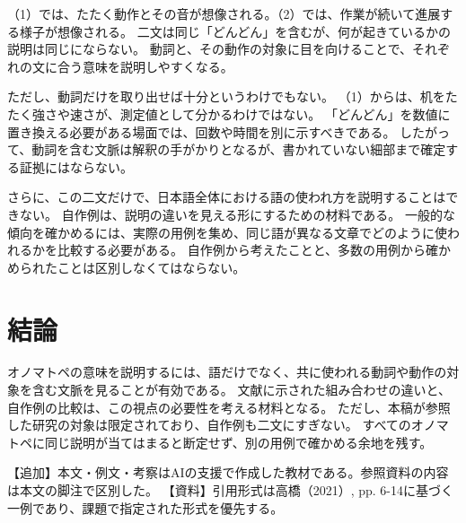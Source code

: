 \documentclass[a4paper,11pt]{ltjsarticle}
\begin{document}
（1）では、たたく動作とその音が想像される。（2）では、作業が続いて進展する様子が想像される。
二文は同じ「どんどん」を含むが、何が起きているかの説明は同じにならない。
動詞と、その動作の対象に目を向けることで、それぞれの文に合う意味を説明しやすくなる。

ただし、動詞だけを取り出せば十分というわけでもない。
（1）からは、机をたたく強さや速さが、測定値として分かるわけではない。
「どんどん」を数値に置き換える必要がある場面では、回数や時間を別に示すべきである。
したがって、動詞を含む文脈は解釈の手がかりとなるが、書かれていない細部まで確定する証拠にはならない。

さらに、この二文だけで、日本語全体における語の使われ方を説明することはできない。
自作例は、説明の違いを見える形にするための材料である。
一般的な傾向を確かめるには、実際の用例を集め、同じ語が異なる文章でどのように使われるかを比較する必要がある。
自作例から考えたことと、多数の用例から確かめられたことは区別しなくてはならない。

\section{結論}
オノマトペの意味を説明するには、語だけでなく、共に使われる動詞や動作の対象を含む文脈を見ることが有効である。
文献に示された組み合わせの違いと、自作例の比較は、この視点の必要性を考える材料となる。
ただし、本稿が参照した研究の対象は限定されており、自作例も二文にすぎない。
すべてのオノマトペに同じ説明が当てはまると断定せず、別の用例で確かめる余地を残す。

\nocite{takahashi2021}
\printbibliography[title={参考文献}]
\begin{small}
\noindent 【追加】本文・例文・考察はAIの支援で作成した教材である。参照資料の内容は本文の脚注で区別した。
【資料】引用形式は高橋（2021）, pp. 6-14に基づく一例であり、課題で指定された形式を優先する。
\end{small}
\end{document}
